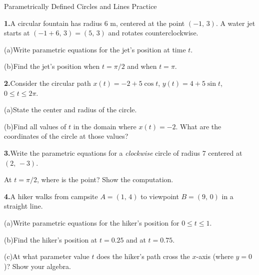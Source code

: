 \documentclass[10pt]{article}
\begin{document}
\namedateperiod

\vspace{0.10in}

\begin{notesbox}{Parametrically Defined Circles and Lines Practice}

\textbf{1.}\quad A circular fountain has radius 6 m, centered at the
point $(-1,\,3)$. A water jet starts at $(-1+6,\,3) = (5,\,3)$ and
rotates counterclockwise.

\vspace{4pt}
(a)\quad Write parametric equations for the jet's position at time $t$.

\writeline

(b)\quad Find the jet's position when $t = \pi/2$ and when $t = \pi$.

\vspace{0.08in}
\textbf{2.}\quad Consider the circular path
$x(t) = -2 + 5\cos t$, $y(t) = 4 + 5\sin t$, $0 \le t \le 2\pi$.

\vspace{4pt}
(a)\quad State the center and radius of the circle.
\writeline

(b)\quad Find all values of $t$ in the domain where $x(t) = -2$.
What are the coordinates of the circle at those values?

\vspace{0.08in}
\textbf{3.}\quad Write the parametric equations for a \emph{clockwise}
circle of radius 7 centered at $(2,\,-3)$.

\writeline

At $t = \pi/2$, where is the point? Show the computation.

\vspace{0.08in}
\textbf{4.}\quad A hiker walks from campsite $A = (1,\,4)$ to
viewpoint $B = (9,\,0)$ in a straight line.

\vspace{4pt}
(a)\quad Write parametric equations for the hiker's position
for $0 \le t \le 1$.
\writeline

(b)\quad Find the hiker's position at $t = 0.25$ and at $t = 0.75$.

(c)\quad At what parameter value $t$ does the hiker's path cross
the $x$-axis (where $y = 0$)? Show your algebra.

\end{notesbox}

\vspace{0.08in}
\end{document}
